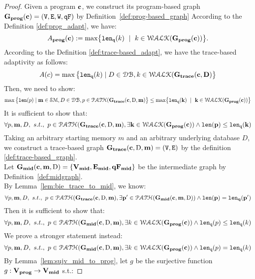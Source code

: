 \subsection{}
\begin{proof}
Given a program ${\boldsymbol{\mathbf{c}}}$, 
we construct its program-based graph $\mathtt{\bf{G_{prog}}}({\boldsymbol{\mathbf{c}}}) = (\mathtt{V}, \mathtt{E}, \mathtt{W}, \mathtt{qF})$
by Definition~\ref{def:prog-based_graph}
According to the Definition \ref{def:prog_adapt}, we have:
%
\[
  \progA(\ssa{c}) 
  := \max\left\{ \qlen(k)\ \mid \  k\in \walks(\progG(\ssa{c}))\right \}.
\]
%
According to the Definition \ref{def:trace-based_adapt}, we have the trace-based adaptivity as follows:
$$
A(c) = \max \big 
\{ \mathtt{len}_{\tt q}(k) \mid D \in \mathcal{DB} , k \in \mathcal{WALK}(\bf{G_{trace}}(c, D) \big \} 
$$
%
Then, we need to show:
\[
\max \big 
\{ \len(p) \mid \ssa{m} \in \mathcal{SM},D \in \dbdom ,p \in \paths(\traceG(\ssa{c}, \text{D}, \ssa{m}) \big \} 
\leq
\max\left\{ \qlen(k) \ \mid \  k\in \walks(\progG(\ssa{c}))\right \}
\]
%
It is sufficient to show that:
\[
  \forall p, {\boldsymbol{\mathbf{m}}}, D, ~ s.t., ~ p \in \mathcal{PATH}(\bf{G_{trace}}({\boldsymbol{\mathbf{c}}}, \text{D}, {\boldsymbol{\mathbf{m}}}),
  \exists k \in \mathcal{WALK}(\mathtt{\bf{G_{prog}}}({\boldsymbol{\mathbf{c}}})) \land 
  \mathtt{len}(p) \leq \mathtt{len}_{\tt q}(k)
\]
%
Taking an arbitrary starting memory $m$ and an arbitrary underlying database $D$,
we construct a trace-based graph $\bf{G_{trace}}({\boldsymbol{\mathbf{c}}}, \text{D}, {\boldsymbol{\mathbf{m}}}) = (\mathtt{V}, \mathtt{E})$ by the definition \ref{def:trace-based_graph}.
%
\\
%
Let $\mathtt{\bf{G_{mid}}}({\boldsymbol{\mathbf{c}}},{\boldsymbol{\mathbf{m}}},\text{D}) = \{\mathtt{\bf{V_{mid}}}, \mathtt{\bf{E_{mid}}}, \mathtt{\bf{qF_{mid}}}\}$ be the intermediate graph by Definition~\ref{def:midgraph}.
\\
By Lemma~\ref{lem:bie_trace_to_mid}, we know:
\[
  \forall p, {\boldsymbol{\mathbf{m}}}, D, ~ s.t., ~ p \in \mathcal{PATH}(\bf{G_{trace}}({\boldsymbol{\mathbf{c}}}, \text{D}, {\boldsymbol{\mathbf{m}}}),
  \exists p' \in \mathcal{PATH}(\mathtt{\bf{G_{mid}}}({\boldsymbol{\mathbf{c}}},{\boldsymbol{\mathbf{m}}},\text{D})) \land 
  \mathtt{len}(p) = \mathtt{len}_q(p')
\]
%
Then it is sufficient to show that:
%
\[
  \forall p, {\boldsymbol{\mathbf{m}}}, D, ~ s.t., ~ p \in \mathcal{PATH}(\mathtt{\bf{G_{mid}}}({\boldsymbol{\mathbf{c}}}, \text{D}, {\boldsymbol{\mathbf{m}}}),
  \exists k \in \mathcal{WALK}(\mathtt{\bf{G_{prog}}}({\boldsymbol{\mathbf{c}}})) \land 
  \mathtt{len}_{\tt q}(p) \leq \mathtt{len}_{\tt q}(k)
\]
%
We prove a stronger statement instead:
\[
  \forall p, {\boldsymbol{\mathbf{m}}}, D, ~ s.t., ~ p \in \mathcal{PATH}(\mathtt{\bf{G_{mid}}}({\boldsymbol{\mathbf{c}}}, \text{D}, {\boldsymbol{\mathbf{m}}}),
  \exists k \in \mathcal{WALK}(\mathtt{\bf{G_{prog}}}({\boldsymbol{\mathbf{c}}})) \land 
  \mathtt{len}_{\tt q}(p) = \mathtt{len}_{\tt q}(k) 
\]
%
%
By Lemma~\ref{lem:sujv_mid_to_prog}, let $g$ be the surjective function $g: \mathtt{\bf{V_{prog}}} \to \mathtt{\bf{V_{mid}}}$ s.t.:

\end{proof}
